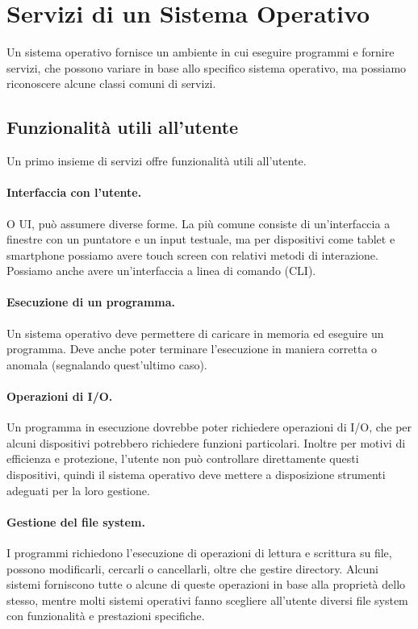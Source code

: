 \section{Servizi di un Sistema Operativo}
    Un sistema operativo fornisce un ambiente in cui eseguire programmi e fornire servizi, che possono variare in base allo specifico sistema operativo, ma possiamo riconoscere alcune classi comuni di servizi.
    
    \subsection{Funzionalità utili all'utente}
        Un primo insieme di servizi offre funzionalità utili all'utente.
        
        \paragraph{Interfaccia con l'utente.} O UI, può assumere diverse forme. La più comune consiste di un'interfaccia a finestre con un puntatore e un input testuale, ma per dispositivi come tablet e smartphone possiamo avere touch screen con relativi metodi di interazione. Possiamo anche avere un'interfaccia a linea di comando (CLI).
        
        \paragraph{Esecuzione di un programma.} Un sistema operativo deve permettere di caricare in memoria ed eseguire un programma. Deve anche poter terminare l'esecuzione in maniera corretta o anomala (segnalando quest'ultimo caso).
        
        \paragraph{Operazioni di I/O.} Un programma in esecuzione dovrebbe poter richiedere operazioni di I/O, che per alcuni dispositivi potrebbero richiedere funzioni particolari. Inoltre per motivi di efficienza e protezione, l'utente non può controllare direttamente questi dispositivi, quindi il sistema operativo deve mettere a disposizione strumenti adeguati per la loro gestione.
        
        \paragraph{Gestione del file system.} I programmi richiedono l'esecuzione di operazioni di lettura e scrittura su file, possono modificarli, cercarli o cancellarli, oltre che gestire directory. Alcuni sistemi forniscono tutte o alcune di queste operazioni in base alla proprietà dello stesso, mentre molti sistemi operativi fanno scegliere all'utente diversi file system con funzionalità e prestazioni specifiche.
        

